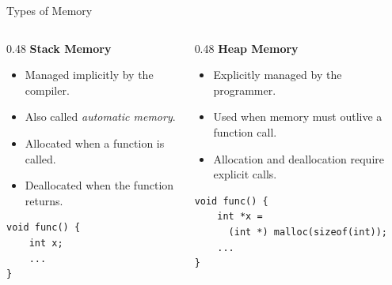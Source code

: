 \begin{frame}[fragile]{Types of Memory}
    \begin{columns}
        \begin{column}{0.48\textwidth}
            \textbf{Stack Memory}
            \begin{itemize}
                \item Managed implicitly by the compiler.
                \item Also called \emph{automatic memory}.
                \item Allocated when a function is called.
                \item Deallocated when the function returns.
            \end{itemize}

\begin{footnotesize}
\begin{verbatim}
void func() {
    int x;
    ...
}
\end{verbatim}
\end{footnotesize}
        \end{column}

        \begin{column}{0.48\textwidth}
            \textbf{Heap Memory}
            \begin{itemize}
                \item Explicitly managed by the programmer.
                \item Used when memory must outlive a function call.
                \item Allocation and deallocation require explicit calls.
            \end{itemize}

\begin{footnotesize}
\begin{verbatim}
void func() {
    int *x =
      (int *) malloc(sizeof(int));
    ...
}
\end{verbatim}
\end{footnotesize}
        \end{column}
    \end{columns}
\end{frame}


